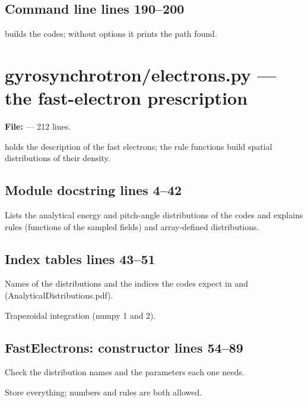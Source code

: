 \section*{\normalsize Command line \hfill{\small\mdseries\color{gray}lines 190--200}}

 builds the codes; without options it prints the path found.


\chapter{gyrosynchrotron/electrons.py --- the fast-electron prescription}
\label{mod:gyrosynchrotron:electrons.py}
\textbf{File:}  --- 212 lines.

 holds the description of the fast electrons; the rule functions
build spatial distributions of their density.

\section*{\normalsize Module docstring \hfill{\small\mdseries\color{gray}lines 4--42}}

Lists the analytical energy and pitch-angle distributions of the codes and explains rules (functions of the sampled fields) and array-defined distributions.

\section*{\normalsize Index tables \hfill{\small\mdseries\color{gray}lines 43--51}}

\begin{lines}
\item[L.47–49] Names of the distributions and the indices the codes expect in  and  (AnalyticalDistributions.pdf).
\item[L.51] Trapezoidal integration (numpy 1 and 2).
\end{lines}
\section*{\normalsize FastElectrons: constructor \hfill{\small\mdseries\color{gray}lines 54--89}}

\begin{lines}
\item[L.72–80] Check the distribution names and the parameters each one needs.
\item[L.81–87] Store everything; numbers and rules are both allowed.
\end{lines}
